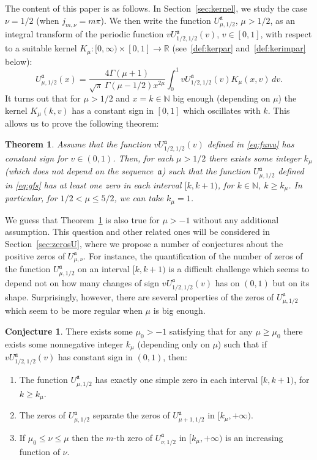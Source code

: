 \documentclass[10pt,a4paper]{article}
\numberwithin{equation}{section}
\theoremstyle{plain}
\newtheorem{Theo}{Theorem}[section]
\theoremstyle{definition}
\newtheorem{Conjecture}{Conjecture}[section]
\newcommand{\aA}{\mathfrak{a}}
\newcommand{\RR}{\mathbb{R}}
\newcommand{\NN}{\mathbb{N}}
\begin{document}
The content of this paper is as follows.
In Section~\ref{sec:kernel}, we study the case $\nu=1/2$ (when $j_{m,\nu}=m\pi$). We then write the function $U_{\mu,1/2}^{\aA}$, $\mu>1/2$, as an integral transform of the periodic function $vU_{1/2,1/2}^\aA(v)$, $v\in[0,1]$, with respect to a suitable kernel $K_\mu:[0,\infty)\times [0,1]\to \RR$ (see~\eqref{def:kerpar} and~\eqref{def:kerimpar} below):
\[
   U_{\mu,1/2}^{\aA}(x)
   = \frac{4\Gamma(\mu+1)}{\sqrt{\pi} \, \Gamma(\mu-1/2)x^{2\mu}}
   \int_0^1 v U^\aA_{1/2,1/2}(v) K_\mu(x,v)\,dv.
\]
It turns out that for $\mu > 1/2$ and $x=k\in \NN$ big enough (depending on $\mu$) the kernel $K_{\mu}(k,v)$ has a constant sign in $[0,1]$ which oscillates with $k$. This allows us to prove the following theorem:

\begin{Theo}
\label{theo:U1/2}
Assume that the function $vU_{1/2,1/2}^{\aA}(v)$ defined in \eqref{eq:funu}
has constant sign for $v\in (0,1)$. Then, for each $\mu > 1/2$ there exists some integer $k_{\mu}$ (which does not depend on the sequence~$\aA$) such that the function $U_{\mu,1/2}^{\aA}$ defined in \eqref{eq:gfs} has at least one zero in each interval $[k,k+1)$, for $k\in \NN$, $k\ge k_{\mu}$. In particular, for $1/2 < \mu \le 5/2$, we can take $k_{\mu}= 1$.
\end{Theo}

We guess that Theorem~\ref{theo:U1/2} is also true for $\mu>-1$ without any additional assumption. This question and other related ones will be considered in Section~\ref{sec:zerosU}, where we propose a number of conjectures about the positive zeros of $U_{\mu,\nu}^{\aA}$. For instance, the quantification of the number of zeros of the function $U_{\mu,1/2}^{\aA}$ on an interval $[k,k+1)$ is a difficult challenge which seems to depend not on how many changes of sign $vU_{1/2,1/2}^{\aA}(v)$ has on $(0,1)$ but on its shape. Surprisingly, however, there are several properties of the zeros of $U_{\mu,1/2}^{\aA}$ which seem to be more regular when $\mu$ is big enough.

\begin{Conjecture}
\label{conj:onezero}
There exists some $\mu_0>-1$ satisfying that for any $\mu\ge \mu_0$ there exists some nonnegative integer $k_\mu$ (depending only on $\mu$) such that if $vU_{1/2,1/2}^{\aA}(v)$ has constant sign in $(0,1)$, then:
\begin{enumerate}
\item The function $U_{\mu,1/2}^{\aA}$ has exactly one simple zero in each interval $[k,k+1)$, for $k\ge k_\mu$.
\item The zeros of $U_{\mu,1/2}^{\aA}$ separate the zeros of $U_{\mu+1,1/2}^\aA$ in $[k_\mu ,+\infty)$.
\item If $\mu_0\le\nu\le \mu$ then the $m$-th zero of $U_{\nu,1/2}^{\aA}$ in $[k_\mu,+\infty)$ is an increasing function of $\nu$.
\end{enumerate}
\end{Conjecture}
\end{document}
